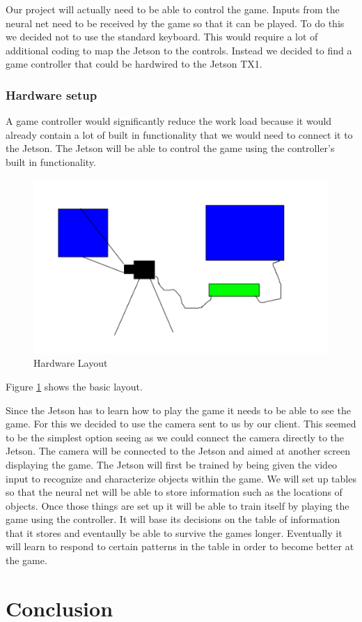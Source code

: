 \documentclass{scrreprt}
\begin{document}
Our project will actually need to be able to control the game.
Inputs from the neural net need to be received by the game so that it can be played.
To do this we decided not to use the standard keyboard.
This would require a lot of additional coding to map the Jetson to the controls.
Instead we decided to find a game controller that could be hardwired to the Jetson TX1.

\subsection{Hardware setup}%

A game controller would significantly reduce the work load because it would already contain a lot of built in functionality that we would need to connect it to the Jetson.
The Jetson will be able to control the game using the controller's built in functionality.

\begin{figure}
  \includegraphics[natwidth=50,natheight=100]{./design.png}
  \caption{Hardware Layout}
  \label{fig:design1}
\end{figure}
Figure \ref{fig:design1} shows the basic layout.

Since the Jetson has to learn how to play the game it needs to be able to see the game.
For this we decided to use the camera sent to us by our client.
This seemed to be the simplest option seeing as we could connect the camera directly to the Jetson.
The camera will be connected to the Jetson and aimed at another screen displaying the game.
The Jetson will first be trained by being given the video input to recognize and characterize objects within the game.
We will set up tables so that the neural net will be able to store information such as the locations of objects.
Once those things are set up it will be able to train itself by playing the game using the controller.
It will base its decisions on the table of information that it stores and eventaully be able to survive the games longer.
Eventually it will learn to respond to certain patterns in the table in order to become better at the game.

\chapter{Conclusion}
\end{document}
